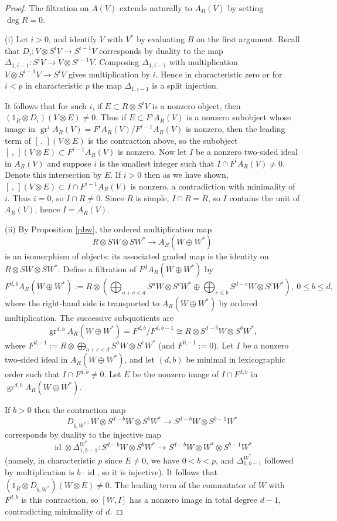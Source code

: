 \documentclass[12pt]{amsart}
\numberwithin{equation}{section}
\providecommand{\id}{}\renewcommand{\id}{\operatorname{id}}
\theoremstyle{plain}
\theoremstyle{definition}
\theoremstyle{remark}
\begin{document}
\begin{proof} The filtration on $A(V)$ extends naturally to $A_R(V)$ by setting $\deg R=0$. 

(i) Let $i>0$, and identify $V$ with $V^*$ by evaluating $B$ on the first argument. Recall that $D_i: V\otimes S^iV\to S^{i-1}V$ corresponds by duality to the map $\Delta_{1,i-1}: S^iV\to V\otimes S^{i-1}V$.
Composing $\Delta_{1,i-1}$ with multiplication $V\otimes S^{i-1}V\to S^iV$ gives multiplication by $i$. Hence  in characteristic zero or for $i<p$ in characteristic $p$ the map $\Delta_{1,i-1}$ is a split injection. 

It follows that for such $i$, if $E\subset R\otimes S^iV$ is a nonzero object, then $(1_R\otimes D_i)(V\otimes E)\ne 0$.
Thus if $E\subset F^iA_R(V)$ is a nonzero subobject whose image in
$\operatorname{gr}^iA_R(V)=F^iA_R(V)/F^{i-1}A_R(V)$
is nonzero, then the leading term of $[\,,\,](V\otimes E)$ is the contraction above, so the subobject $[\,,\,](V\otimes E)\subset F^{i-1}A_R(V)$ is nonzero. Now let $I$ be a nonzero two-sided ideal in $A_R(V)$ and suppose $i$ is the smallest integer such that $I\cap F^iA_R(V)\ne 0$. Denote this intersection by $E$. If $i>0$ then as we have shown, $[\,,\,](V\otimes E)\subset I\cap F^{i-1}A_R(V)$ is nonzero, a contradiction with minimality of $i$. Thus $i=0$, so $I\cap R\ne 0$. Since $R$ is simple, $I\cap R=R$, so $I$ contains the unit of $A_R(V)$, hence $I=A_R(V)$. 

(ii) By Proposition \ref{pbw}, the ordered multiplication map
\[
R\otimes SW\otimes SW^*\longrightarrow A_R(W\oplus W^*)
\]
is an isomorphism of objects: its associated graded map is the identity on $R\otimes SW\otimes SW^*$. Define a filtration of $F^dA_R(W\oplus W^*)$ by \scriptsize
\[ 
F^{d,b}A_R(W\oplus W^*):=R\otimes\left(\bigoplus_{a+c<d}S^aW\otimes S^cW^*
\oplus\bigoplus_{c\le b}S^{d-c}W\otimes S^cW^*\right),
\ 0\le b\le d,
\] \normalsize
where the right-hand side is transported to $A_R(W\oplus W^*)$ by ordered multiplication.
The successive subquotients are
\[
\operatorname{gr}^{d,b}A_R(W\oplus W^*)=F^{d,b}/F^{d,b-1}\cong R\otimes S^{d-b}W\otimes S^bW^*,
\]
where $F^{d,-1}:=R\otimes\bigoplus_{a+c<d}S^aW\otimes S^cW^*$ (and $F^{0,-1}:=0$). Let $I$ be a nonzero two-sided ideal in $A_R(W\oplus W^*)$, and let $(d,b)$ be minimal in lexicographic order such that $I\cap F^{d,b}\ne0$. Let $E$ be the nonzero image of $I\cap F^{d,b}$ in $\operatorname{gr}^{d,b}A_R(W\oplus W^*)$.

If $b>0$ then the contraction map 
$$
D_{b,W^*}: W\otimes S^{d-b}W\otimes S^bW^*\to S^{d-b}W\otimes S^{b-1}W^*
$$ 
corresponds by duality to the injective map 
$$
\id\otimes \Delta_{1,b-1}^{W^*}: S^{d-b}W\otimes S^bW^*\to S^{d-b}W\otimes W^*\otimes S^{b-1}W^*
$$ 
(namely, in characteristic $p$ since $E\ne0$, we have $0<b<p$, and $\Delta^{W^*}_{1,b-1}$ followed by multiplication is $b\cdot \id$, so it is injective). It follows that  $(1_R\otimes D_{b,W^*})(W\otimes E)\ne 0$.
The leading term of the commutator of $W$ with $F^{d,b}$ is this contraction, so $[W,I]$ has a nonzero image in total degree $d-1$, contradicting minimality of $d$.


\end{proof}
\end{document}
